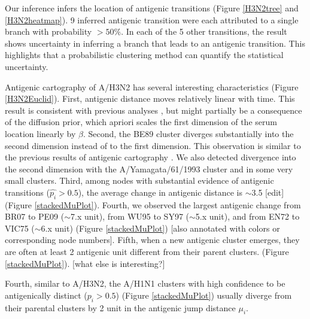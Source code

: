 \documentclass[11pt,oneside,letterpaper]{article}
\begin{document}
Our inference infers the location of antigenic transitions (Figure \ref{H3N2tree} and \ref{H3N2heatmap}). 
9 inferred antigenic transition were each attributed to a single branch with probability $>50\%$. In each of the 5 other transitions, the result shows uncertainty in inferring a branch that leads to an antigenic transition. 
This highlights that a probabilistic clustering method can quantify the statistical uncertainty. %




Antigenic cartography of A/H3N2 has several interesting characteristics (Figure \ref{H3N2Euclid}). 
First, antigenic distance moves relatively linear with time.  
This result is consistent with previous analyses \cite{smith_mapping_2004, bedford_integrating_2014}, but might partially be a consequence of the diffusion prior, which apriori scales the first dimension of the serum location linearly by $\beta$. 
Second, the BE89 cluster diverges substantially into the second dimension instead of to the first dimension.
This observation is similar to the previous results of antigenic cartography \cite{smith_mapping_2004, bedford_integrating_2014}. 
We also detected divergence into the second dimension with the A/Yamagata/61/1993 cluster and in some very small clusters. 
Third, among nodes with substantial evidence of antigenic transitions ($\hat{p_i} > 0.5$), the average change in antigenic distance is $\sim$3.5 [edit] (Figure \ref{stackedMuPlot}). 
Fourth, we observed the largest antigenic change from BR07 to PE09 ($\sim$7.x unit), from WU95 to SY97 ($\sim$5.x unit), and from EN72 to VIC75 ($\sim$6.x unit) (Figure \ref{stackedMuPlot}) [also annotated with colors or corresponding node numbers].
Fifth, when a new antigenic cluster emerges, they are often at least 2 antigenic unit different  from their parent clusters.  (Figure \ref{stackedMuPlot}). 
[what else is interesting?]

Fourth, similar to A/H3N2, the A/H1N1 clusters with high confidence to be antigenically distinct ($p_i > 0.5$) (Figure \ref{stackedMuPlot}) usually diverge from their parental clusters by 2 unit in the antigenic jump distance $\mu_i$.
\end{document}
